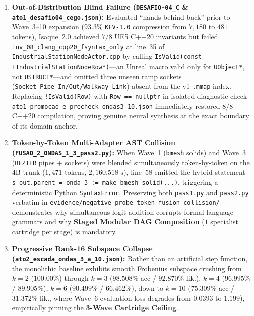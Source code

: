 \documentclass[10pt,a4paper]{article}
\begin{document}
\begin{enumerate}
  \item \textbf{Out-of-Distribution Blind Failure (\texttt{DESAFIO-04\_\allowbreak{}C} \& \texttt{ato1\_\allowbreak{}desafio04\_\allowbreak{}cego.json}):} Evaluated ``hands-behind-back'' prior to Wave~3--10 expansion ($93.3\%$ \texttt{KEV-1.0} compression from $7,180$ to $481$ tokens), Isaque~2.0 achieved $7/8$ UE5 C++20 invariants but failed \texttt{inv\_\allowbreak{}08\_\allowbreak{}clang\_\allowbreak{}cpp20\_\allowbreak{}fsyntax\_\allowbreak{}only} at line~35 of \texttt{IndustrialStationNodeActor.cpp} by calling \texttt{IsValid(const FIndustrialStationNodeRow*)}---an Unreal macro valid only for \texttt{UObject*}, not \texttt{USTRUCT*}---and omitted three unseen ramp sockets (\texttt{Socket\_\allowbreak{}Pipe\_\allowbreak{}In/Out/Walkway\_\allowbreak{}Link}) absent from the v1 \texttt{.mmap} index. Replacing \texttt{!IsValid(Row)} with \texttt{Row == nullptr} in isolated diagnostic check \texttt{ato1\_\allowbreak{}promocao\_\allowbreak{}e\_\allowbreak{}precheck\_\allowbreak{}ondas3\_\allowbreak{}10.json} immediately restored $8/8$ C++20 compilation, proving genuine neural synthesis at the exact boundary of its domain anchor.
  \item \textbf{Token-by-Token Multi-Adapter AST Collision (\texttt{FUSAO\_\allowbreak{}2\_\allowbreak{}ONDAS\_\allowbreak{}1\_\allowbreak{}3\_\allowbreak{}pass2.py}):} When Wave~1 (\texttt{bmesh} solids) and Wave~3 (\texttt{BEZIER} pipes + sockets) were blended simultaneously token-by-token on the $4\text{B}$ trunk ($1,471$ tokens, $2,160.518\text{ s}$), line~58 emitted the hybrid statement \texttt{s\_\allowbreak{}out.parent = onda\_\allowbreak{}3 := make\_\allowbreak{}bmesh\_\allowbreak{}solid(...)}, triggering a deterministic Python \texttt{SyntaxError}. Preserving both \texttt{pass1.py} and \texttt{pass2.py} verbatim in \texttt{evidence/negative\_\allowbreak{}probe\_\allowbreak{}token\_\allowbreak{}fusion\_\allowbreak{}collision/} demonstrates why simultaneous logit addition corrupts formal language grammars and why \textbf{Staged Modular DAG Composition} ($1$ specialist cartridge per stage) is mandatory.
  \item \textbf{Progressive Rank-16 Subspace Collapse (\texttt{ato2\_\allowbreak{}escada\_\allowbreak{}ondas\_\allowbreak{}3\_\allowbreak{}a\_\allowbreak{}10.json}):} Rather than an artificial step function, the monolithic baseline exhibits smooth Frobenius subspace crushing from $k=2$ ($100.00\%$) through $k=3$ ($98.508\%$ acc / $92.870\%$ lik.), $k=4$ ($96.995\%$ / $89.905\%$), $k=6$ ($90.499\%$ / $66.462\%$), down to $k=10$ ($75.309\%$ acc / $31.372\%$ lik., where Wave~6 evaluation loss degrades from $0.0393$ to $1.199$), empirically pinning the \textbf{3-Wave Cartridge Ceiling}.
\end{enumerate}
\end{document}
